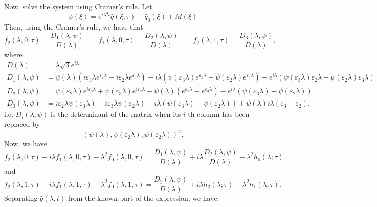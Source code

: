 Now, solve the system using Cramer's rule. Let
\[ 
\psi(\xi) = e^{i \lambda^3 t}\widehat{q}(\xi,\tau) - \widehat{q}_0(\xi) + M(\xi)
\]
Then, using the Cramer's rule, we have that 
\[ f_2(\lambda, 0, \tau) = \frac{D_1(\lambda, \psi)}{D(\lambda)}\qquad f_1(\lambda, 0, \tau) = \frac{D_2(\lambda, \psi)}{D(\lambda)} \qquad f_2(\lambda, 1, \tau) = \frac{D_3(\lambda, \psi)}{D(\lambda)},\]
where
\begin{align*}
    D(\lambda) &= \lambda\sqrt{3}e^{i\lambda} \\
    D_1(\lambda, \psi) &= \psi(\lambda)(i\varepsilon_3\lambda e^{\varepsilon_2\lambda} - i\varepsilon_2\lambda e^{\varepsilon_3\lambda}) - i\lambda(\psi(\varepsilon_3\lambda)e^{\varepsilon_2\lambda} -\psi(\varepsilon_2\lambda)e^{\varepsilon_3\lambda}) - e^{i\lambda}(\psi(\varepsilon_3\lambda)\varepsilon_2\lambda -\psi(\varepsilon_2\lambda)\varepsilon_3\lambda) \\
    D_2(\lambda, \psi) &= \psi(\varepsilon_2\lambda)e^{i \varepsilon_3\lambda} + \psi(\varepsilon_3\lambda)e^{i \varepsilon_2\lambda} -\psi(\lambda)( e^{\varepsilon_2\lambda} - e^{\varepsilon_3\lambda}) -e^{i\lambda}(\psi(\varepsilon_3\lambda) - \psi(\varepsilon_2\lambda)) \\
    D_3(\lambda, \psi) &= i \varepsilon_2\lambda \psi(\varepsilon_3\lambda)-i \varepsilon_3\lambda \psi(\varepsilon_2\lambda) - i\lambda(\psi(\varepsilon_3\lambda) - \psi(\varepsilon_2 \lambda)) + \psi(\lambda) i \lambda (\varepsilon_3 - \varepsilon_2),
\end{align*}
i.e. $D_i(\lambda, \psi)$ is the determinant of the matrix when its $i$-th column has been replaced by \[(\psi(\lambda), \psi(\varepsilon_2\lambda), \psi(\varepsilon_2\lambda))^T.\] Now, we have 
\begin{equation*}
    f_2(\lambda, 0, \tau) + i \lambda f_1(\lambda, 0, \tau) - \lambda^2 f_0(\lambda, 0, \tau) = \frac{D_1(\lambda, \psi)}{D(\lambda)} + i \lambda \frac{D_2(\lambda, \psi)}{D(\lambda)} - \lambda^2 h_0(\lambda; \tau)
\end{equation*}
and
\begin{equation*}
    f_2(\lambda, 1, \tau) + i \lambda f_1(\lambda, 1, \tau) - \lambda^2 f_0(\lambda, 1, \tau) = \frac{D_3(\lambda, \psi)}{D(\lambda)} + i \lambda h_2(\lambda; \tau) - \lambda^2 h_1(\lambda, \tau).
\end{equation*}
Separating $\hat{q}(\lambda,t)$ from the known part of the expression, we have:
